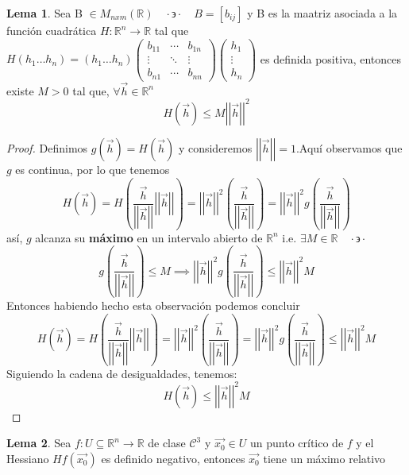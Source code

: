 \documentclass[letterpaper]{article}
\providecommand{\norm}[1]{\left|\left|#1\right|\right|}
\newcommand{\tq}{ \quad \cdot  \backepsilon \cdot \quad }
\newcommand{\R}{\mathds{R}}
\renewcommand{\*}{\cdot}
\theoremstyle{definition}
\newtheorem{lema}{Lema}
\begin{document}
	\begin{lema}
		Sea B $ \in M_{nxm}(\R) \tq B = [b_{ij}]$ y B es la maatriz asociada a la función cuadrática $ H: \R^n \to \R $ tal que $ H(h_1 \dots h_n) = (h_1 \dots h_n) \begin{pmatrix}
		b_{11} & \cdots & b_{1n}\\ 
		\vdots & \ddots & \vdots \\
		b_{n1} & \cdots & b_{nn}
		\end{pmatrix} \begin{pmatrix}
		h_1 \\
		\vdots\\
		h_n
		\end{pmatrix} $ es definida positiva, entonces existe $ M > 0$ tal que, $ \forall \vec{h} \in \R^n $ \[ H(\vec{h}) \leq M \norm{\vec{h}}^2 \]
	\end{lema}
\begin{proof}
	Definimos $ g(\vec{h}) = H(\vec{h}) $ y consideremos $ \norm{\vec{h}} = 1 $.Aquí observamos que $ g $ es continua, por lo que tenemos
	\[ H(\vec{h}) = H\left( \dfrac{\vec{h}}{\norm{\vec{h}}} \norm{\vec{h}} \right) = \norm{\vec{h}}^2\left( \dfrac{\vec{h}}{\norm{\vec{h}}} \right) = \norm{\vec{h}}^2g\left(\dfrac{\vec{h}}{\norm{\vec{h}}}\right) \]
	así, $ g $ alcanza su \textbf{máximo} en un intervalo abierto de $ \R^n $ i.e. $ \exists M \in \R \tq$ $$ g\left(\dfrac{\vec{h}}{\norm{\vec{h}}}\right) \leq M \implies \norm{\vec{h}}^2g\left(\dfrac{\vec{h}}{\norm{\vec{h}}}\right) \leq \norm{\vec{h}}^2M $$ 
	Entonces habiendo hecho esta observación podemos concluir
	\[ H(\vec{h}) = H\left( \dfrac{\vec{h}}{\norm{\vec{h}}} \norm{\vec{h}} \right) = \norm{\vec{h}}^2\left( \dfrac{\vec{h}}{\norm{\vec{h}}} \right) = \norm{\vec{h}}^2g\left(\dfrac{\vec{h}}{\norm{\vec{h}}}\right)\leq \norm{\vec{h}}^2M  \]
	Siguiendo la cadena de desigualdades, tenemos:
	\[ H(\vec{h}) \leq \norm{\vec{h}}^2M \]
\end{proof}
\begin{lema}
	Sea $ f : U \subseteq \R^n \to \R $ de clase $ \mathcal{C}^{3} $ y $ \vec{x_0} \in U $ un punto crítico de $ f $ y el Hessiano $ Hf(\vec{x_0}) $ es definido negativo, entonces $ \vec{x_0} $ tiene un máximo relativo
\end{lema}
\end{document}
